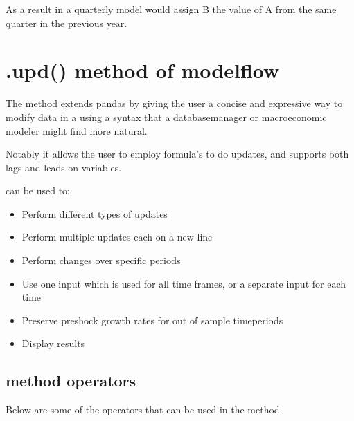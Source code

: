 \documentclass[letterpaper,10pt,english]{jupyterBook}
\begin{document}
\sphinxAtStartPar
As a result in a quarterly model  would assign B the value of A from the same quarter in the previous year.


\section{.upd() method of modelflow}
\label{\detokenize{content/04_PythonEssentials/UpdateCommand:upd-method-of-modelflow}}
\sphinxAtStartPar
The  method extends pandas by giving the user a concise and expressive way to modify data in a  using a syntax that a database\sphinxhyphen{}manager or macroeconomic modeler might find more natural.

\sphinxAtStartPar
Notably it allows the user to employ formula’s to do updates, and supports both lags and leads on variables.

\sphinxAtStartPar
{} can be used to:
\begin{itemize}
\item {} 
\sphinxAtStartPar
Perform different types of  updates

\item {} 
\sphinxAtStartPar
Perform multiple updates each on a new line

\item {} 
\sphinxAtStartPar
Perform changes over specific periods

\item {} 
\sphinxAtStartPar
Use one input which is used for all time frames, or a separate input for each time

\item {} 
\sphinxAtStartPar
Preserve pre\sphinxhyphen{}shock growth rates for out of sample time\sphinxhyphen{}periods

\item {} 
\sphinxAtStartPar
Display results

\end{itemize}


\subsection{ method operators}
\label{\detokenize{content/04_PythonEssentials/UpdateCommand:upd-method-operators}}
\sphinxAtStartPar
Below are some of the operators that can be used in the  method
\end{document}
